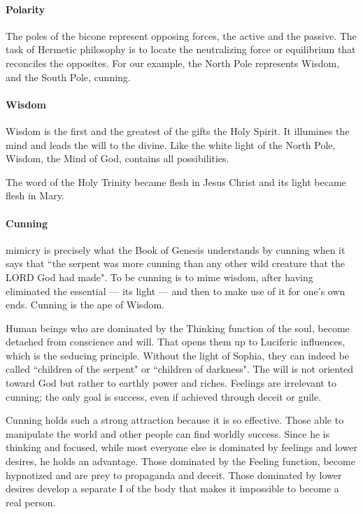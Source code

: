 \paragraph{Polarity}
The poles of the bicone represent opposing forces, the active and the passive. The task of Hermetic philosophy is to
locate the neutralizing force or equilibrium that reconciles the opposites. For our example, the North Pole represents
Wisdom, and the South Pole, cunning.

\paragraph{Wisdom}
Wisdom is the first and the greatest of the gifts the Holy Spirit. It illumines the mind and leads the will to the
divine. Like the white light of the North Pole, Wisdom, the Mind of God, contains all possibilities.

The word of the Holy Trinity became flesh in Jesus Christ and its light became flesh in Mary.

\paragraph{Cunning}
\begin{quotex}
mimicry is precisely what the Book of Genesis understands by cunning when it says that ``the serpent was more cunning
than any other wild creature that the LORD God had made". To be cunning is to mime wisdom, after having eliminated the
essential — its light — and then to make use of it for
one's own ends. Cunning is the ape of Wisdom. 

\end{quotex}
Human beings who are dominated by the Thinking function of the soul, become detached from conscience and will. That
opens them up to Luciferic influences, which is the seducing principle. Without the light of Sophia, they can indeed be
called ``children of the serpent" or ``children of darkness". The will is not oriented toward God but rather to earthly
power and riches. Feelings are irrelevant to cunning; the only goal is success, even if achieved through deceit or
guile.

Cunning holds such a strong attraction because it is so effective. Those able to manipulate the world and other people
can find worldly success. Since he is thinking and focused, while most everyone else is dominated by feelings and lower
desires, he holds an advantage. Those dominated by the Feeling function, become hypnotized and are prey to propaganda
and deceit. Those dominated by lower desires develop a separate I of the body that makes it impossible to become a real
person.

